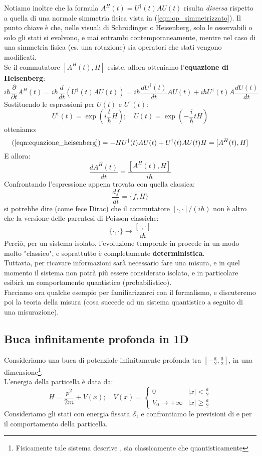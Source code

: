 \documentclass[../../FisicaTeorica.tex]{subfiles}
\begin{document}
Notiamo inoltre che la formula $A^H(t) = U^\dag(t) A U(t)$ risulta \textit{diversa} rispetto a quella di una normale simmetria fisica vista in (\ref{eqn:op_simmetrizzato}). Il punto chiave è che, nelle visuali di Schr\"odinger o Heisenberg, solo le osservabili o solo gli stati si evolvono, e mai entrambi contemporaneamente, mentre nel caso di una simmetria fisica (es. una rotazione) sia operatori che stati vengono modificati.\\

Se il commutatore $[A^H(t), H]$ esiste, allora otteniamo l'\textbf{equazione di Heisenberg}:
\begin{equation}
i\hbar \frac{\partial}{\partial t}A^H(t) = i\hbar \frac{d}{dt}(U^\dag(t)AU(t)) = i\hbar \frac{dU^\dag(t)}{dt}AU(t)+i\hbar U^\dag(t)A\frac{dU(t)}{dt}
\label{eqn:equazione_heisenberg}
\end{equation}
Sostituendo le espressioni per $U(t)$ e $U^\dag(t)$:
\[
U^\dag(t)=\exp\left(i\frac{t}{\hbar}H\right); \quad U(t)=\exp\left(-\frac{i}{\hbar}tH\right)
\]
otteniamo:
\[
(\ref{eqn:equazione_heisenberg}) = -HU^\dag(t)AU(t)+U^\dag(t)AU(t)H=[A^H(t),H]
\]
E allora:
\[
\frac{dA^H(t)}{dt}=\frac{[A^H(t),H]}{i\hbar}
\]
Confrontando l'espressione appena trovata con quella classica:
\[
\frac{df}{dt}=\{f,H\}
\]
si potrebbe dire (come fece Dirac) che il commutatore $[\cdot,\cdot]/(i\hbar)$ non è altro che la versione  delle parentesi di Poisson classiche:
\[
\{\cdot,\cdot\} \to \frac{[\cdot,\cdot]}{i\hbar}
\]
Perciò, per un sistema isolato, l'evoluzione temporale in \MQ procede in un modo molto "classico", e soprattutto è completamente \textbf{deterministica}.\\
Tuttavia, per ricavare informazioni sarà necessario fare una misura, e in quel momento il sistema non potrà più essere considerato isolato, e in particolare esibirà un comportamento quantistico (probabilistico).\\
Facciamo ora qualche esempio per familiarizzarci con il formalismo, e discuteremo poi la teoria della misura (cosa succede ad un sistema quantistico a seguito di una misurazione).\\
\subsection{Buca infinitamente profonda in 1D}
\label{sec:buca_infinita_1D}
Consideriamo una buca di potenziale infinitamente profonda tra $[-\frac{a}{2},\frac{a}{2}]$, in una dimensione\footnote{Fisicamente tale sistema descrive , sia classicamente che quantisticamente}.\\
L'energia della particella è data da:
\[
H=\frac{p^2}{2m}+V(x); \quad V(x)=\begin{cases}
0 & |x|<\frac{a}{2}\\
V_0\to +\infty & |x|\geq \frac{a}{2}
\end{cases}
\]
Consideriamo gli stati con energia fissata $\mathcal{E}$, e confrontiamo le previsioni di \MC e \MQ per il comportamento della particella.
\end{document}
